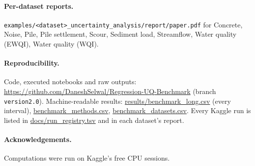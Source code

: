 \documentclass[11pt]{article}
\begin{document}
\paragraph{Per-dataset reports.} \texttt{examples/<dataset>\_uncertainty\_analysis/report/paper.pdf} for Concrete, Noise, Pile, Pile settlement, Scour, Sediment load, Streamflow, Water quality (EWQI), Water quality (WQI).
\paragraph{Reproducibility.} Code, executed notebooks and raw outputs: \url{https://github.com/DaneshSelwal/Regression-UQ-Benchmark} (branch \texttt{version2.0}). Machine-readable results:
\url{results/benchmark_long.csv} (every interval), \url{benchmark_methods.csv}, \url{benchmark_datasets.csv}. Every Kaggle run is listed in
\url{docs/run_registry.tsv} and in each dataset's report.
\paragraph{Acknowledgements.} Computations were run on Kaggle's free CPU sessions.
\FloatBarrier

\end{document}
